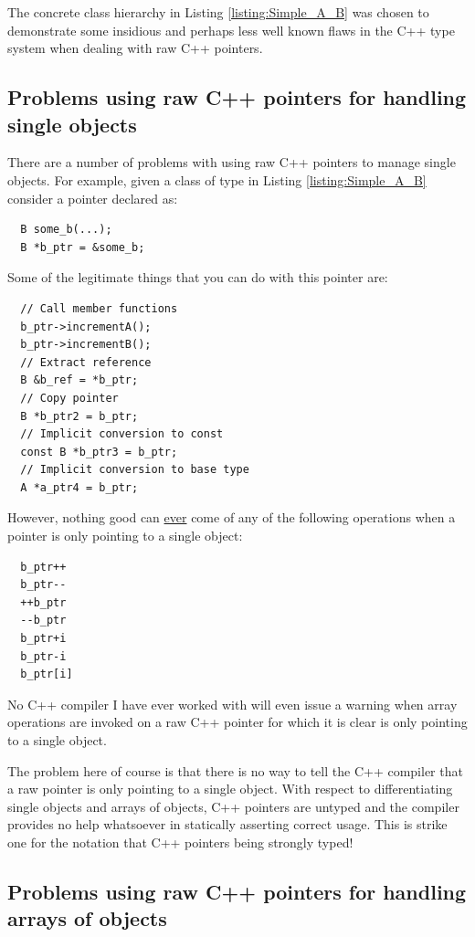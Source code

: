 \documentclass[pdf,ps2pdf,11pt]{SANDreport}
\begin{document}
The concrete class hierarchy in Listing {}\ref{listing:Simple_A_B} was
chosen to demonstrate some insidious and perhaps less well known flaws
in the C++ type system when dealing with raw C++ pointers.


%
{}\subsection{Problems using raw C++ pointers for handling single objects}
%

There are a number of problems with using raw C++ pointers to manage
single objects.  For example, given a class of type {} in
Listing {}\ref{listing:Simple_A_B} consider a pointer declared as:

{\small\begin{verbatim}
  B some_b(...);
  B *b_ptr = &some_b;
\end{verbatim}}

Some of the legitimate things that you can do with this pointer are:

{\small\begin{verbatim}
  // Call member functions
  b_ptr->incrementA();
  b_ptr->incrementB();
  // Extract reference
  B &b_ref = *b_ptr;
  // Copy pointer
  B *b_ptr2 = b_ptr;
  // Implicit conversion to const
  const B *b_ptr3 = b_ptr;
  // Implicit conversion to base type
  A *a_ptr4 = b_ptr;
\end{verbatim}}

However, nothing good can {}\underline{ever} come of any of the
following operations when a pointer is only pointing to a single
object:

{\small\begin{verbatim}
  b_ptr++
  b_ptr--
  ++b_ptr
  --b_ptr
  b_ptr+i
  b_ptr-i
  b_ptr[i]
\end{verbatim}}

No C++ compiler I have ever worked with will even issue a warning when
array operations are invoked on a raw C++ pointer for which it is
clear is only pointing to a single object.

The problem here of course is that there is no way to tell the C++
compiler that a raw pointer is only pointing to a single object.  With
respect to differentiating single objects and arrays of objects, C++
pointers are untyped and the compiler provides no help whatsoever in
statically asserting correct usage.  This is strike one for the
notation that C++ pointers being strongly typed!


%
{}\subsection{Problems using raw C++ pointers for handling arrays of
objects}
\label{sec:problem-with-raw-array-pointers}
%
\end{document}
